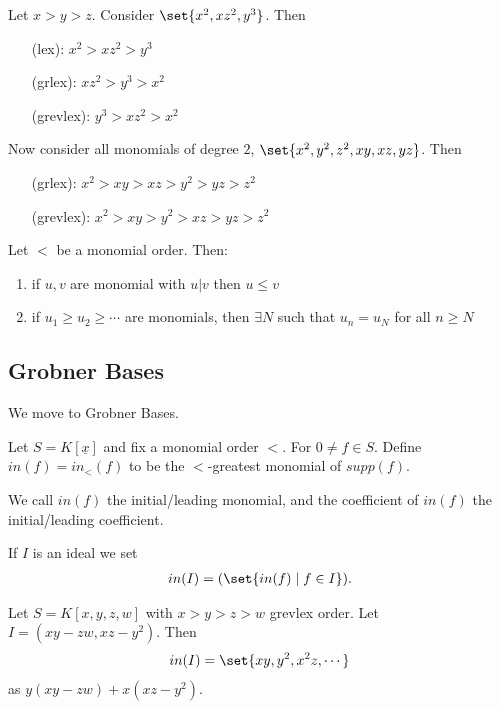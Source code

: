 \begin{example}
Let $x>y>z$. Consider $\set{x^2, xz^2, y^3}$. Then
\begin{itemize}
    \item[(lex):] $x^2 > xz^2 > y^3$
    \item[(grlex):] $xz^2 > y^3 > x^2$
    \item[(grevlex):] $ y^3 > xz^2 > x^2$
\end{itemize}
Now consider all monomials of degree $2$, $\set{x^2, y^2, z^2, xy,xz,yz}$. Then
\begin{itemize}
    \item[(grlex):] $x^2 > xy > xz > y^2 > yz > z^2$
    \item[(grevlex):] $ x^2 > xy > y^2 > xz > yz > z^2 $
\end{itemize}
\end{example}

\begin{proposition}
Let $<$ be a monomial order. Then:
\begin{enumerate}
    \item if $u,v$ are monomial with $u | v$ then $u \leq v$
    \item if $u_1 \geq u_2 \geq \cdots$ are monomials, then $\exists N$ such that $u_n = u_N$ for all $n \geq N$ 
\end{enumerate}
\end{proposition}

\subsection{Grobner Bases}

We move to Grobner Bases.

\begin{definition}
Let $S = K[ \underline{x}]$ and fix a monomial order $<$. For $0 \neq f \in S$. Define $in(f) = in_< (f)$ to be the $<$-greatest monomial of $supp(f)$.

We call $in(f) $ the initial/leading monomial, and the coefficient of $in(f)$ the initial/leading coefficient.

If $I$ is an ideal we set
\begin{align*}
    in(I) = ( \set{in (f) \mid f \in I}).
\end{align*}
\end{definition}

\begin{example}
Let $S = K[ x,y,z,w]$ with $x>y>z>w$ grevlex order. Let $I = (xy - zw, xz - y^2)$. Then
\begin{align*}
    in(I) = \set{xy, y^2, x^2z, \cdots}
\end{align*}
as $y(xy-zw) + x(xz - y^2)$.
\end{example}

